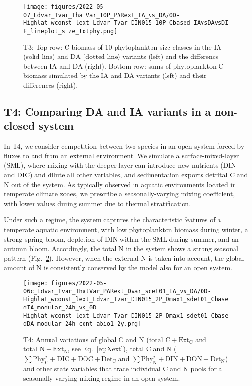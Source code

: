 \documentclass[gmd, manuscript]{copernicus}
\begin{document}
\begin{figure}[ht!]
\texttt{[image: figures/2022-05-07\_Ldvar\_Tvar\_ThatVar\_10P\_PARext\_IA\_vs\_DA/0D-Highlat\_wconst\_lext\_Ldvar\_Tvar\_DIN015\_10P\_Cbased\_IAvsDAvsDIF\_lineplot\_size\_totphy.png]}
\caption{T3: Top row: C biomass of 10 phytoplankton size classes in the IA (solid line) and DA (dotted line) variants (left) and the difference between IA and DA (right). Bottom row: sums of phytoplankton C biomass simulated by the IA and DA variants (left) and their differences (right).
}\label{f.T3res}
\end{figure}

\FloatBarrier%
\subsection{T4: Comparing DA and IA variants in a non-closed system}\label{s.resT4}

In T4, we consider competition between two species in an open system forced by fluxes to and from an external environment.  We simulate a surface-mixed-layer (SML), where mixing with the deeper layer can introduce new nutrients (DIN and DIC) and dilute all other variables, and sedimentation exports detrital C and N out of the system. As typically observed in aquatic environments located in temperate climate zones, we prescribe a seasonally-varying mixing coefficient, with lower values during summer due to thermal stratification.

Under such a regime, the system captures the characteristic features of a temperate aquatic environment, with low phytoplankton biomass during winter, a strong spring bloom, depletion of DIN within the SML during summer, and an autumn bloom. Accordingly, the total N in the system shows a strong seasonal pattern (Fig.~\ref{f.T4res}). However, when the external N is taken into account, the global amount of N is consistently conserved by the model also for an open system.

\begin{figure}[ht!]
\texttt{[image: figures/2022-05-06c\_Ldvar\_Tvar\_ThatVar\_PARext\_Dvar\_sdet01\_IA\_vs\_DA/0D-Highlat\_wconst\_lext\_Ldvar\_Tvar\_DIN015\_2P\_Dmax1\_sdet01\_CbasedIA\_modular\_24h\_vs\_0D-Highlat\_wconst\_lext\_Ldvar\_Tvar\_DIN015\_2P\_Dmax1\_sdet01\_CbasedDA\_modular\_24h\_cont\_abio1\_2y.png]}
\caption{T4: Annual variations of global C and N ($\text{total C} + \text{Ext}_{\text{C}}$ and $\text{total N} + \text{Ext}_{\text{N}}$, see Eq.~\ref{eq:Xext}), total C and N ($\sum\text{Phy}_{\text{C}}^j + \text{DIC} + \text{DOC} + \text{Det}_{\text{C}}$ and $\sum\text{Phy}_{\text{N}}^j + \text{DIN} + \text{DON} + \text{Det}_{\text{N}}$) and other state variables that trace individual C and N pools for a seasonally varying mixing regime in an open system.
\label{f.T4res}}
\end{figure}
\end{document}
